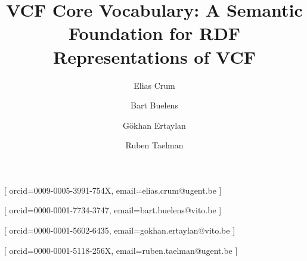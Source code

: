 \documentclass{ceurart}
\begin{document}

\title{VCF Core Vocabulary: A Semantic Foundation for RDF Representations of VCF}

\author[1,2]{Elias Crum}[
orcid=0009-0005-3991-754X,
email=elias.crum@ugent.be
]
\cormark[1]
\author[2]{Bart Buelens}[
orcid=0000-0001-7734-3747,
email=bart.buelens@vito.be
]
\author[2]{Gökhan Ertaylan}[
orcid=0000-0001-5602-6435,
email=gokhan.ertaylan@vito.be
]
\author[1]{Ruben Taelman}[
orcid=0000-0001-5118-256X,
email=ruben.taelman@ugent.be
]
\address[1]{IDLab, Department of Electronics and Information Systems, Ghent University -- imec, Belgium}
\address[2]{Flemish Institute for Technological Research (VITO), Mol, Belgium}
\end{document}
